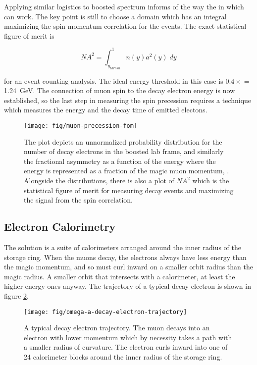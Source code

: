 Applying similar logistics to boosted spectrum informs of the way the in which \gmtwo can work.  The key point is still to choose a domain which has an integral maximizing the spin-momentum correlation for the events.  The exact statistical figure of merit is 

\begin{equation}
\label{eqn:expt-figure-of-merit}
NA^2 = \int_{y_{thresh}}^{1} n(y) a^2(y) \;dy
\end{equation}

for an event counting analysis.  The ideal energy threshold in this case is $0.4\times$\pmagic$ = $ \SI{1.24}{\GeV}.  The connection of muon spin to the decay electron energy is now established, so the last step in measuring the spin precession requires a technique which measures the energy and the decay time of emitted electons.\cite{e821-prd}

\begin{figure}
\label{fig:muon-precession-fom}
\centering
\texttt{[image: fig/muon-precession-fom]}
\caption{The plot depicts an unnormalized probability distribution for the number of decay electrons in the boosted lab frame, and similarly the fractional asymmetry as a function of the energy where the energy is represented as a fraction of the magic muon momentum, \pmagic. Alongside the distributions, there is also a plot of $NA^2$ which is the statistical figure of merit for measuring decay events and maximizing the signal from the spin correlation.}
\end{figure}

\subsection{Electron Calorimetry}

The solution is a suite of calorimeters arranged around the inner radius of the storage ring.  When the muons decay, the electrons always have less energy than the magic momentum, and so must curl inward on a smaller orbit radius than the magic radius.  A smaller orbit that intersects with a calorimeter, at least the higher energy ones anyway. The trajectory of a typical decay electron is shown in figure \ref{fig:omega-a-decay-electron-trajectory}.

\begin{figure}
\label{fig:omega-a-decay-electron-trajectory}
\texttt{[image: fig/omega-a-decay-electron-trajectory]}
\caption{A typical decay electron trajectory.  The muon decays into an electron with lower momentum which by necessity takes a path with a smaller radius of curvature.  The electron curls inward into one of 24 calorimeter blocks around the inner radius of the storage ring.}
\end{figure}

